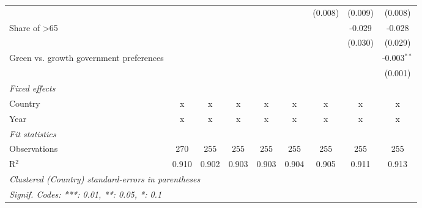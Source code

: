 \begin{table}[htbp]
\begin{tabular}{lcccccccc}
                                                       &         &         &         &         &         & (0.008) & (0.009) & (0.008)\\   
      Share of >65                                     &         &         &         &         &         &         & -0.029  & -0.028\\   
                                                       &         &         &         &         &         &         & (0.030) & (0.029)\\   
      Green vs. growth government preferences          &         &         &         &         &         &         &         & -0.003$^{**}$\\   
                                                       &         &         &         &         &         &         &         & (0.001)\\   
      \emph{Fixed effects}\\
      Country                                          & x       & x       & x       & x       & x       & x       & x       & x\\  
      Year                                             & x       & x       & x       & x       & x       & x       & x       & x\\  
      \midrule \emph{Fit statistics}\\
      Observations                                     & 270     & 255     & 255     & 255     & 255     & 255     & 255     & 255\\  
      R$^2$                                            & 0.910   & 0.902   & 0.903   & 0.903   & 0.904   & 0.905   & 0.911   & 0.913\\  
      \midrule
      \multicolumn{9}{l}{\emph{Clustered (Country) standard-errors in parentheses}}\\
      \multicolumn{9}{l}{\emph{Signif. Codes: ***: 0.01, **: 0.05, *: 0.1}}\\
   \end{tabular}
\end{table}


